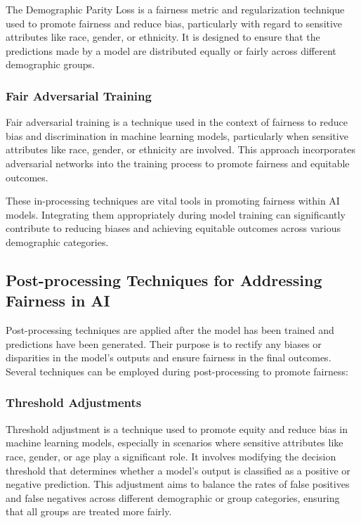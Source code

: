 \documentclass[12pt,a4paper,openright,twoside]{book}
\begin{document}
The Demographic Parity Loss is a fairness metric and regularization technique used to promote fairness and reduce bias, particularly with regard to sensitive attributes like race, gender, or ethnicity. It is designed to ensure that the predictions made by a model are distributed equally or fairly across different demographic groups. \cite{jiang2022generalized}

\subsubsection{Fair Adversarial Training}

Fair adversarial training is a technique used in the context of fairness to reduce bias and discrimination in machine learning models, particularly when sensitive attributes like race, gender, or ethnicity are involved. This approach incorporates adversarial networks into the training process to promote fairness and equitable outcomes. \cite{pmlr-v139-xu21b}

These in-processing techniques are vital tools in promoting fairness within AI models. Integrating them appropriately during model training can significantly contribute to reducing biases and achieving equitable outcomes across various demographic categories.

\subsection{Post-processing Techniques for Addressing Fairness in AI}

Post-processing techniques are applied after the model has been trained and predictions have been generated. Their purpose is to rectify any biases or disparities in the model's outputs and ensure fairness in the final outcomes. Several techniques can be employed during post-processing to promote fairness:

\subsubsection{Threshold Adjustments}

Threshold adjustment is a technique used to promote equity and reduce bias in machine learning models, especially in scenarios where sensitive attributes like race, gender, or age play a significant role. It involves modifying the decision threshold that determines whether a model's output is classified as a positive or negative prediction. This adjustment aims to balance the rates of false positives and false negatives across different demographic or group categories, ensuring that all groups are treated more fairly. \cite{10.1145/3447548.3467251}
\end{document}
